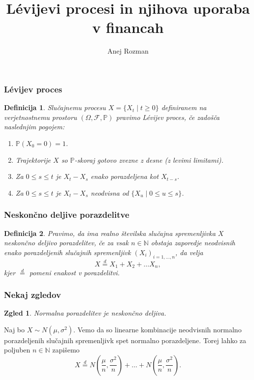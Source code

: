 \documentclass[]{beamer} %
\title{Lévijevi procesi in njihova uporaba v financah}
\subtitle{}
\author[Anej Rozman]{Anej Rozman}
\institute[]{Mentor: doc.~dr. Martin Raič}
\date[]{}
\theoremstyle{plain}
\newtheorem{definicija}{Definicija}
\newtheorem{zgled}{Zgled}
\begin{document}
\frame{\titlepage}

\begin{frame}
  \frametitle{Lévijev proces}
  \begin{definicija}
      Slučajnemu procesu $X = \{X_t \mid t \geq 0\}$ definiranem na verjetnostnemu
      prostoru $(\Omega, \mathcal{F}, \mathds{P})$ pravimo \textit{Lévijev proces}, če zadošča naslednjim pogojem:
      \begin{enumerate}
          \item $\mathds{P}(X_0 = 0)=1$.
          \item Trajektorije $X$ so $\mathds{P}$-skoraj gotovo zvezne z desne (z levimi limitami).
          \item Za $0 \leq s \leq t$ je $X_t - X_s$ enako porazdeljena kot $X_{t-s}$.
          \item Za $0 \leq s \leq t$ je $X_t - X_s$ neodvisna od $\{X_u \mid 0 \leq u \leq s\}$.
      \end{enumerate}
  \end{definicija}
\end{frame}

\begin{frame}
  \frametitle{Neskončno deljive porazdelitve}
  \begin{definicija}
    Pravimo, da ima realno številska slučajna spremenljivka $X$ \textit{neskončno deljivo porazdelitev}, če
    za vsak $n \in \mathbb{N}$ obstaja zaporedje neodvisnih enako porazdeljenih 
    slučajnih spremenljivk $\left(X_i\right)_{i=1,\dots,n}$, da velja
    $$
    X \stackrel{d}{=} X_1 + X_2 + \dots X_n,
    $$
    kjer $\stackrel{d}{=}$ pomeni enakost v porazdelitvi.
\end{definicija}


  \end{frame}


\begin{frame}
  \frametitle{Nekaj zgledov}
  \begin{zgled}
    Normalna porazdelitev je neskončno deljiva.
  \end{zgled}
  \begin{center}
    Naj bo $X \sim N(\mu, \sigma^2)$. Vemo da so linearne kombinacije neodvisnih normalno 
    porazdeljenih slučajnih spremenljivk spet normalno porazdeljene. Torej lahko za poljuben 
    $n\in\mathbb{N}$ zapišemo
    $$
      X \stackrel{d}{=} N(\frac{\mu}{n}, \frac{\sigma^2}{n}) + \dots + N(\frac{\mu}{n}, \frac{\sigma^2}{n}).
    $$
  \end{center}
\end{frame}
\end{document}
